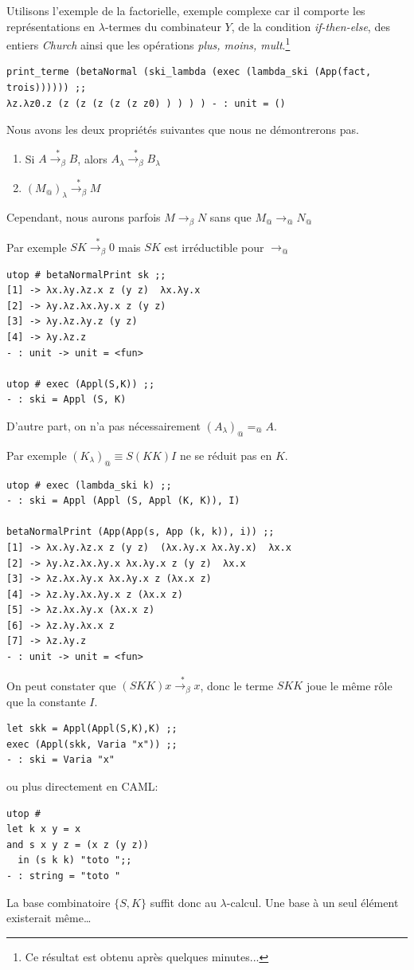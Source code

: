 \documentclass[11pt]{book}
\newcommand{\trans}{\overset{*}{\longrightarrow_{\beta}}}
\begin{document}
Utilisons l'exemple de la factorielle, exemple complexe car il comporte les représentations en $\lambda$-termes
du combinateur $Y$, de la condition \textit{if-then-else}, des entiers \textit{Church} ainsi que les opérations
\textit{plus, moins, mult}.\footnote{Ce résultat est obtenu après quelques minutes...}
\begin{Verbatim}
print_terme (betaNormal (ski_lambda (exec (lambda_ski (App(fact, trois)))))) ;;
λz.λz0.z (z (z (z (z (z z0) ) ) ) ) - : unit = ()	
\end{Verbatim}

Nous avons les deux propriétés suivantes que nous ne démontrerons pas.
\begin{enumerate}
	\item Si $A \trans B$, alors $A_\lambda \trans B_\lambda$ \\
	\item $(M_@)_\lambda \trans M $ \\
\end{enumerate}


Cependant, nous aurons parfois $M \longrightarrow_\beta N$ sans que $M_@ \longrightarrow_@ N_@$

Par exemple $SK \trans 0$ mais $SK$ est irréductible pour $\longrightarrow_@$
\begin{Verbatim}
utop # betaNormalPrint sk ;;
[1] -> λx.λy.λz.x z (y z)  λx.λy.x
[2] -> λy.λz.λx.λy.x z (y z) 
[3] -> λy.λz.λy.z (y z) 
[4] -> λy.λz.z
- : unit -> unit = <fun>	

utop # exec (Appl(S,K)) ;;
- : ski = Appl (S, K)
\end{Verbatim}

D'autre part, on n'a pas nécessairement $(A_\lambda)_@ =_@ A$.

Par exemple $(K_\lambda)_@ \equiv S(KK)I$  ne se réduit pas en $K$.
\begin{Verbatim}
utop # exec (lambda_ski k) ;;
- : ski = Appl (Appl (S, Appl (K, K)), I)

betaNormalPrint (App(App(s, App (k, k)), i)) ;;
[1] -> λx.λy.λz.x z (y z)  (λx.λy.x λx.λy.x)  λx.x
[2] -> λy.λz.λx.λy.x λx.λy.x z (y z)  λx.x
[3] -> λz.λx.λy.x λx.λy.x z (λx.x z) 
[4] -> λz.λy.λx.λy.x z (λx.x z) 
[5] -> λz.λx.λy.x (λx.x z) 
[6] -> λz.λy.λx.x z
[7] -> λz.λy.z
- : unit -> unit = <fun>
\end{Verbatim}
On peut constater que $(SKK)x \trans x $, donc le terme $SKK$ joue le même rôle
que la constante $I$. 
\begin{Verbatim}
let skk = Appl(Appl(S,K),K) ;;
exec (Appl(skk, Varia "x")) ;;
- : ski = Varia "x"
\end{Verbatim}
ou plus directement en CAML:
\begin{Verbatim}
utop # 
let k x y = x
and s x y z = (x z (y z)) 
  in (s k k) "toto ";;
- : string = "toto "
\end{Verbatim}
La base combinatoire $\{S,K\}$ suffit donc au $\lambda$-calcul. 
Une base à un seul élément existerait même\dots
\end{document}
